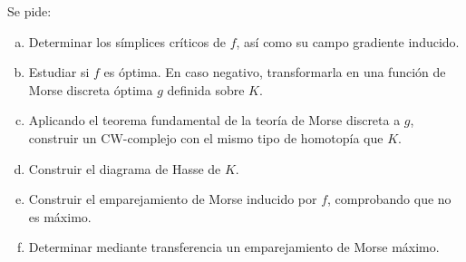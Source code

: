 \documentclass[twoside]{article}
\begin{document}
\begin{ejercicio}{5}
Se pide:
\begin{enumerate}[(a)]
\item Determinar los símplices críticos de $f$, así como su campo gradiente inducido.
\item Estudiar si $f$ es óptima. En caso negativo, transformarla en una función de Morse discreta óptima $g$ definida sobre $K$.
\item Aplicando el teorema fundamental de la teoría de Morse discreta a $g$, construir un CW-complejo con el mismo tipo de homotopía que $K$.
\item Construir el diagrama de Hasse de $K$.
\item Construir el emparejamiento de Morse inducido por $f$, comprobando que no es máximo.
\item Determinar mediante transferencia un emparejamiento de Morse máximo. 
\end{enumerate}
\end{ejercicio}
\begin{solucion}
\end{solucion}
\end{document}
